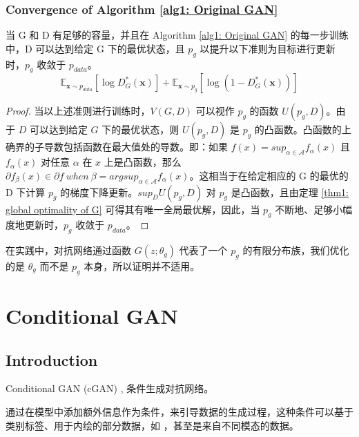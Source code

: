 \documentclass{myarticle}
\begin{document}
    \subsubsection{Convergence of Algorithm \ref{alg1: Original GAN}}

    \begin{proposition}
        当 G 和 D 有足够的容量，并且在 Algorithm \ref{alg1: Original GAN} 的每一步训练中，D 可以达到给定 G 下的最优状态，且 $p_g$ 以提升以下准则为目标进行更新时，$p_g$ 收敛于 $p_{data}$。
        \begin{equation}
            \mathbb{E}_{\bm{x}\sim p_{data}} \left [\log D_G^{*}(\bm{x})\right ] + \mathbb{E}_{\bm{x}\sim p_g} \left [\log (1-D_G^{*}(\bm{x}))\right ]
        \end{equation}
    \end{proposition}

    \begin{proof}
        当以上述准则进行训练时，$V(G,D)$ 可以视作 $p_g$ 的函数 $U(p_g,D)$。由于 $D$ 可以达到给定 $G$ 下的最优状态，则 $U(p_g,D)$ 是 $p_g$ 的凸函数。凸函数的上确界的子导数包括函数在最大值处的导数。即：如果 $f(x)=sup_{\alpha\in\mathcal{A}}f_{\alpha}(x)$ 且 $f_{\alpha}(x)$ 对任意 $\alpha$ 在 $x$ 上是凸函数，那么 $\partial f_{\beta}(x)\in\partial f\ when\ \beta=argsup_{\alpha\in\mathcal{A}}f_{\alpha}(x)$。这相当于在给定相应的 G 的最优的 D 下计算 $p_g$ 的梯度下降更新。$sup_D U(p_g,D)$ 对 $p_g$ 是凸函数，且由定理 \ref{thm1: global optimality of G} 可得其有唯一全局最优解，因此，当 $p_g$ 不断地、足够小幅度地更新时，$p_g$ 收敛于 $p_{data}$。
        
        \QED
    \end{proof}

    \rmk 在实践中，对抗网络通过函数 $G(z;\theta_g)$ 代表了一个 $p_g$ 的有限分布族，我们优化的是 $\theta_g$ 而不是 $p_g$ 本身，所以证明并不适用。

    \section{Conditional GAN}

    \subsection{Introduction}

    Conditional GAN (cGAN) \cite{mirza_con_gan_2014}, 条件生成对抗网络。

    通过在模型中添加额外信息作为条件，来引导数据的生成过程，这种条件可以基于类别标签、用于内绘的部分数据，如 \cite{Goodfellow_DBM_2013}，甚至是来自不同模态的数据。
\end{document}
